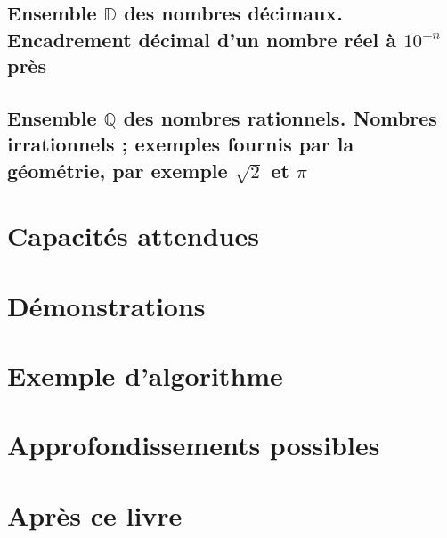 \documentclass[11pt]{article}
\begin{document}
\subsection{Ensemble \(\mathbb{D}\) des nombres décimaux. Encadrement décimal d'un nombre réel à \(10^{-n}\) près}
\label{sec:org6416331}
\subsection{Ensemble \(\mathbb{Q}\) des nombres rationnels. Nombres irrationnels ; exemples fournis par la géométrie, par exemple \(\sqrt{2}\) et \(\pi\)}
\label{sec:org8081ab6}

\section{Capacités attendues}
\label{sec:orgb7bb030}
\section{Démonstrations}
\label{sec:org11deca3}
\section{Exemple d'algorithme}
\label{sec:org8803207}
\section{Approfondissements possibles}
\label{sec:org8396eef}
\section{Après ce livre}
\label{sec:org93bb440}
\end{document}
